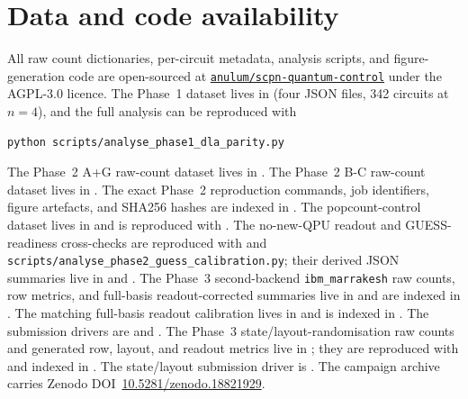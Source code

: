 \documentclass[reprint,aps,physrev,superscriptaddress,floatfix,longbibliography]{revtex4-2}
\begin{document}
\section*{Data and code availability}

All raw count dictionaries, per-circuit metadata, analysis scripts,
and figure-generation code are open-sourced at
\href{https://github.com/anulum/scpn-quantum-control}{\texttt{anulum/scpn-quantum-control}}
under the
AGPL-3.0 licence. The Phase~1 dataset lives in
 (four JSON files, 342 circuits at
$n = 4$), and the full analysis can be reproduced with
%
\begin{verbatim}
python scripts/analyse_phase1_dla_parity.py
\end{verbatim}
%
The Phase~2 A+G raw-count dataset lives in
. The Phase~2 B-C raw-count dataset
lives in . The exact Phase~2
reproduction commands, job identifiers, figure artefacts, and SHA256
hashes are indexed in
.
The popcount-control dataset lives in
 and is reproduced with
.
The no-new-QPU readout and GUESS-readiness cross-checks are reproduced
with  and
\mbox{\texttt{scripts/analyse\_phase2\_guess\_calibration.py}}; their derived
JSON summaries live in  and
. The Phase~3 second-backend
\texttt{ibm\_marrakesh} raw counts, row metrics, and full-basis
readout-corrected summaries live in
 and are indexed in
. The
matching full-basis readout calibration lives in
 and is indexed in
. The submission
drivers are  and
. The Phase~3
state/layout-randomisation raw counts and generated row, layout, and
readout metrics live in ; they are
reproduced with  and
indexed in
. The
state/layout submission driver is
.
The campaign archive carries Zenodo
DOI~\href{https://doi.org/10.5281/zenodo.18821929}{10.5281/zenodo.18821929}.
\end{document}
